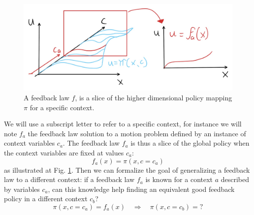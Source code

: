 \begin{figure}[htb]
\vspace{-5pt}
\begin{center}
\includegraphics[width=0.95\linewidth]{fig/slice2.jpg}
\caption{A feedback law $f$, is a slice of the higher dimensional policy mapping $\pi$ for a specific context.
}\label{fig:slice}
\end{center}
\vspace{-5pt}
\end{figure}

We will use a subscript letter to refer to a specific context, for instance we will note $f_a$ the feedback law solution to a motion problem defined by an instance of context variables $c_a$. The feedback law $f_a$ is thus a slice of the global policy when the context variables are fixed at values $c_a$:
\begin{equation}
f_a \left(
x 
\right) 
=
\pi \left(
x,
c = c_a
\right)
\end{equation}
as illustrated at Fig. \ref{fig:slice}. Then we can formalize the goal of generalizing a feedback law to a different context: if a feedback law $f_a$ is known for a context $a$ described by variables $c_a$, can this knowledge help finding an equivalent good feedback policy in a different context $c_b$?
\begin{equation}
\pi \left(
x,
c = c_a
\right) = 
f_a \left(
x 
\right) 
\quad \Rightarrow \quad
\pi \left(
x,
c = c_b
\right) = ?
\end{equation}

